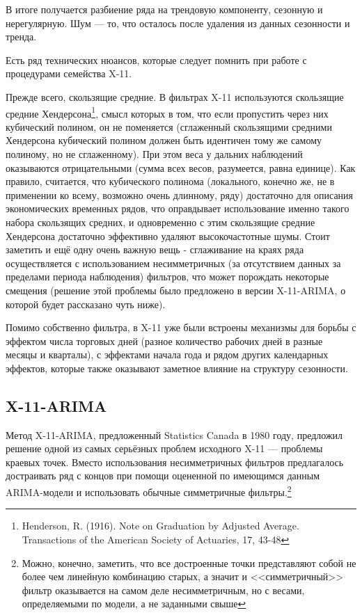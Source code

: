 \documentclass[final,pdftex]{../../template/epsilonj}\usepackage[]{graphicx}\usepackage[]{color}
\begin{document}
В итоге получается разбиение ряда на трендовую компоненту, сезонную и нерегулярную. Шум --- то, что осталось после удаления из данных сезонности и тренда. 

Есть ряд технических нюансов, которые следует помнить при работе с процедурами семейства X-11. 

Прежде всего, скользящие средние. В фильтрах X-11 используются скользящие средние Хендерсона\footnote{Henderson, R. (1916). Note on Graduation by Adjusted Average. Transactions of the American Society of Actuaries, 17, 43-48}, смысл которых в том, что если пропустить через них кубический полином, он не поменяется (сглаженный скользящими средними Хендерсона кубический полином должен быть идентичен тому же самому полиному, но не сглаженному). При этом веса у дальних наблюдений оказываются отрицательными (сумма всех весов, разумеется, равна единице). Как правило, считается, что кубического полинома (локального, конечно же, не в применении ко всему, возможно очень длинному, ряду) достаточно для описания экономических временных рядов, что оправдывает использование именно такого набора скользящих средних, и одновременно с этим скользящие средние Хендерсона достаточно эффективно удаляют высокочастотные шумы. 
Стоит заметить и ещё одну очень важную вещь - сглаживание на краях ряда осуществляется с использованием несимметричных (за отсутствием данных за пределами периода наблюдения) фильтров, что может порождать некоторые смещения (решение этой проблемы было предложено в версии X-11-ARIMA, о которой будет рассказано чуть ниже). 

Помимо собственно фильтра, в X-11 уже были встроены механизмы для борьбы с эффектом числа торговых дней (разное количество рабочих дней в разные месяцы и кварталы), с эффектами начала года и рядом других календарных эффектов, которые также оказывают заметное влияние на структуру сезонности. 

\subsection{X-11-ARIMA}

Метод X-11-ARIMA, предложенный Statistics Canada в 1980 году, предложил решение одной из самых серьёзных проблем исходного X-11 --- проблемы краевых точек. Вместо использования несимметричных фильтров предлагалось достраивать ряд с концов при помощи оцененной по имеющимся данным ARIMA-модели и использовать обычные симметричные фильтры.\footnote{Можно, конечно, заметить, что все достроенные точки представляют собой не более чем линейную комбинацию старых, а значит и <<симметричный>> фильтр оказывается на самом деле несимметричным, но с весами, определяемыми по модели, а не заданными свыше} 
\end{document}
